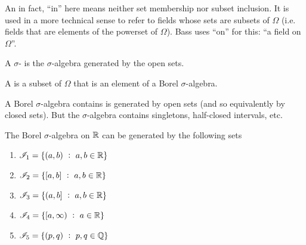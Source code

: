 An in fact, ``in​'' here means neither set membership nor subset inclusion. It is used in a more technical sense
to refer to fields whose sets are subsets of $\Omega$ (i.e. fields that are elements of the powerset
of $\Omega$). Bass uses ``on​'' for this: ``a field on $\Omega$​''.

\begin{definition}
  A  $\sigma$- is the $\sigma$-algebra generated by the open sets.

  A  is a subset of $\Omega$ that is an element of a Borel $\sigma$-algebra.
\end{definition}

A Borel $\sigma$-algebra contains is generated by open sets (and so equivalently by closed sets). But
the $\sigma$-algebra contains singletons, half-closed intervals, etc.

\begin{theorem}
  The Borel $\sigma$-algebra on $\mathbb{R}$ can be generated by the following sets
  \begin{enumerate}
  \item $\mathscr I_1 = \{(a, b) ~:~ a, b \in \mathbb{R}\}$
  \item $\mathscr I_2 = \{[a, b] ~:~ a, b \in \mathbb{R}\}$
  \item $\mathscr I_3 = \{(a, b] ~:~ a, b \in \mathbb{R}\}$
  \item $\mathscr I_4 = \{[a, \infty) ~:~ a \in \mathbb{R}\}$
  \item $\mathscr I_5 = \{(p, q) ~:~ p, q \in \mathbb{Q}\}$
  \end{enumerate}
\end{theorem}

